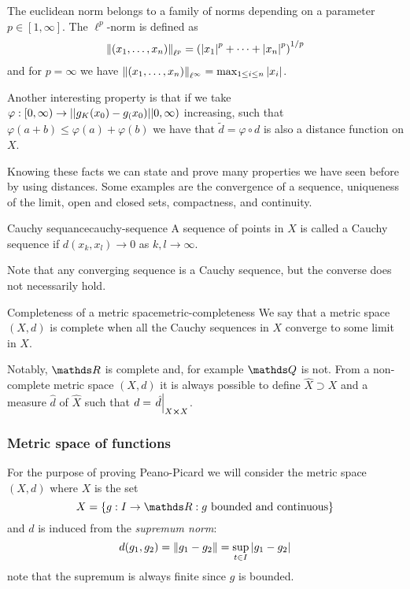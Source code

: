\documentclass[12pt]{extarticle}
\begin{document}
The euclidean norm belongs to a family of norms depending on a parameter $p \in [1, \infty]$.
The $\ell^p$-norm is defined as
\begin{equation}
	\norm{(x_1, \dots, x_n)}_{\ell^p} = \left( \abs{x_1}^p + \dots + \abs{x_n}^p \right)^{1/p}
\end{equation}
and for $p = \infty$ we have $\norm{(x_1, \dots, x_n)}_{\ell^\infty} = \max_{1 \leq i \leq n} \abs{x_i}$.

Another interesting property is that if we take $\varphi : [0, \infty) \to\abs{}g_K(x_0) - g_(x_0)\abs{}0, \infty)$ increasing,
such that $\varphi(a + b) \leq \varphi(a) + \varphi(b)$ we have that $\tilde d = \varphi \circ d$
is also a distance function on $X$.

Knowing these facts we can state and prove many properties we have seen before by using distances.
Some examples are the convergence of a sequence, uniqueness of the limit, open and closed sets,
compactness, and continuity.

\begin{definition}{Cauchy sequance}{cauchy-sequence}
	A sequence of points in $X$ is called a Cauchy sequence if $d(x_k, x_l) \to 0$ as $k, l \to \infty$.
\end{definition}

Note that any converging sequence is a Cauchy sequence, but the converse does not necessarily hold.

\begin{definition}{Completeness of a metric space}{metric-completeness}
	We say that a metric space $(X, d)$ is complete when all the Cauchy sequences
	in $X$ converge to some limit in $X$.
\end{definition}

Notably, $\R$ is complete and, for example $\Q$ is not.
From a non-complete metric space $(X, d)$ it is always possible to define $\hat X \supset X$ and
a measure $\hat d$ of $\hat X$ such that $d = \eval{\hat d}_{X \cross X}$.

\subsubsection{Metric space of functions}
\label{sec:metric-space-func}

For the purpose of proving Peano-Picard we will consider the metric space $(X, d)$ where $X$ is the set
\begin{equation}
	X = \{ g:I \to \R : g \text{ bounded and continuous} \}
\end{equation}
and $d$ is induced from the \emph{supremum norm}:
\begin{equation}
	d(g_1, g_2) = \norm{g_1 - g_2} = \sup_{t \in I} \abs{g_1 - g_2}
\end{equation}
note that the supremum is always finite since $g$ is bounded.
\end{document}
